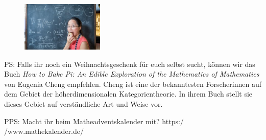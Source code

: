 \documentclass{anschreiben}
\begin{document}
\begin{figure}
  \vspace*{-1.2em}
  \hfill\includegraphics[width=0.35\textwidth]{eugenia-cheng}
\end{figure}

PS: Falls ihr noch ein Weihnachtsgeschenk für euch selbst sucht, können wir das
Buch \emph{How to Bake Pi: An Edible Exploration of the Mathematics of Mathematics}
von Eugenia Cheng empfehlen. Cheng ist eine der bekanntesten Forscherinnen auf dem
Gebiet der höherdimensionalen Kategorientheorie. In ihrem Buch stellt sie dieses
Gebiet auf verständliche Art und Weise vor.

PPS: Macht ihr beim Matheadventskalender mit?
https:/$\!$/www.mathekalender.de/

\newpage
\fi\ifmore\repeat

\closein\quelle
\end{document}
